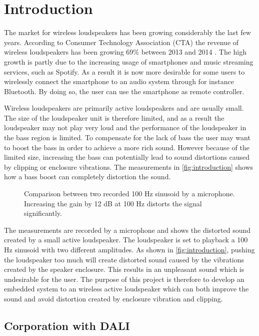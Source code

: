 \chapter{Introduction}

The market for wireless loudspeakers has been growing considerably the last few years. According to Consumer Technology Association (CTA) the revenue of wireless loudspeakers has been growing 69\% between 2013 and 2014 \cite{sou:CTA}. The high growth is partly due to the increasing usage of smartphones and music streaming services, such as Spotify. As a result it is now more desirable for some users to wirelessly connect the smartphone to an audio system through for instance Bluetooth. By doing so, the user can use the smartphone as remote controller. 

Wireless loudspeakers are primarily active loudspeakers and are usually small. The size of the loudspeaker unit is therefore limited, and as a result the loudspeaker may not play very loud and the performance of the loudspeaker in the bass region is limited. To compensate for the lack of bass the user may want to boost the bass in order to achieve a more rich sound. However because of the limited size, increasing the bass can potentially lead to sound distortions caused by clipping or enclosure vibrations. The measurements in \autoref{fig:introduction} shows how a bass boost can completely distortion the sound.

\begin{figure}[H]
\centering
{}

\caption{Comparison between two recorded 100 Hz sinusoid by a microphone. Increasing the gain by 12 dB at 100 Hz distorts the signal significantly.}
\label{fig:introduction}
\end{figure}

The measurements are recorded by a microphone and shows the distorted sound created by a small active loudspeaker. The loudspeaker is set to playback a 100 Hz sinusoid with two different amplitudes. As shown in \autoref{fig:introduction}, pushing the loudspeaker too much will create distorted sound caused by the vibrations created by the speaker enclosure. This results in an unpleasant sound which is undesirable for the user. The purpose of this project is therefore to develop an embedded system to an wireless active loudspeaker which can both improve the sound and avoid distortion created by enclosure vibration and clipping.

\section{Corporation with DALI}








